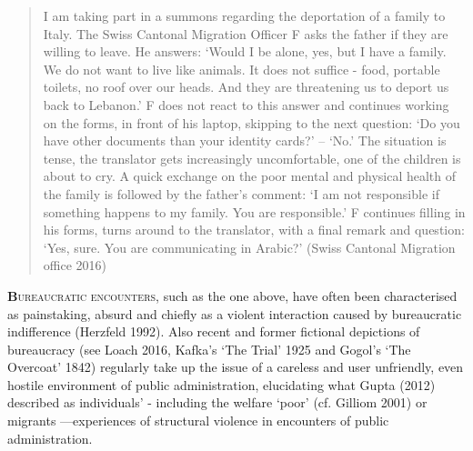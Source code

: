 
    \blockquote{I am taking part in a summons regarding the deportation of a family to Italy. The Swiss Cantonal Migration Officer F asks the father if they are willing to leave. He answers: ‘Would I be alone, yes, but I have a family. We do not want to live like animals. It does not suffice - food, portable toilets, no roof over our heads. And they are threatening us to deport us back to Lebanon.’ F does not react to this answer and continues working on the forms, in front of his laptop, skipping to the next question: ‘Do you have other documents than your identity cards?’ – ‘No.’ The situation is tense, the translator gets increasingly uncomfortable, one of the children is about to cry. A quick exchange on the poor mental and physical health of the family is followed by the father’s comment: ‘I am not responsible if something happens to my family. You are responsible.’ F continues filling in his forms, turns around to the translator, with a final remark and question: ‘Yes, sure. You are communicating in Arabic?’ (Swiss Cantonal Migration office 2016)}\columnbreak
\noindent\lettrine[lines=2]{\bfseries\color{black}B}{ureaucratic encounters}, such as the one above, have often been characterised as painstaking, absurd and chiefly as a violent interaction caused by bureaucratic indifference (Herzfeld 1992). Also recent and former fictional depictions of bureaucracy (see Loach 2016, Kafka’s ‘The Trial’ 1925 and Gogol’s ‘The Overcoat’ 1842) regularly take up the issue of a careless and user unfriendly, even hostile environment of public administration, elucidating what Gupta (2012) described as individuals’ - including the welfare ‘poor’ (cf. Gilliom 2001) or migrants  ---experiences of structural violence in encounters of public administration.
